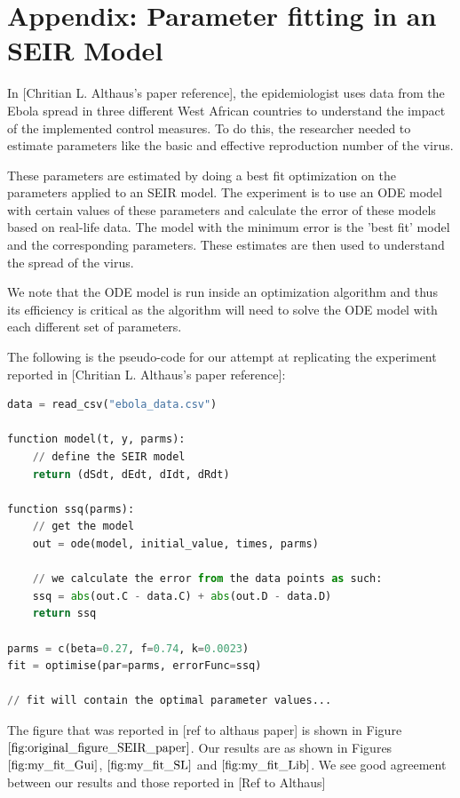 \section{Appendix: Parameter fitting in an SEIR Model}
\label{section:ebola_paper}
In [Chritian L. Althaus's paper reference], the epidemiologist uses data from the Ebola spread in three different West African countries to understand the impact of the implemented control measures. To do this, the researcher needed to estimate parameters like the basic and effective reproduction number of the virus.

These parameters are estimated by doing a best fit optimization on the parameters applied to an SEIR model. The experiment is to use an ODE model with certain values of these parameters and calculate the error of these models based on real-life data. The model with the minimum error is the 'best fit' model and the corresponding parameters. These estimates are then used to understand the spread of the virus. 

We note that the ODE model is run inside an optimization algorithm and thus its efficiency is critical as the algorithm will need to solve the ODE model with each different set of parameters.

The following is the pseudo-code for our attempt at replicating the experiment reported in [Chritian L. Althaus's paper reference]:

\begin{minipage}{\linewidth}
\begin{lstlisting}[language=Python]
data = read_csv("ebola_data.csv")

function model(t, y, parms):
    // define the SEIR model
    return (dSdt, dEdt, dIdt, dRdt)

function ssq(parms):
    // get the model
    out = ode(model, initial_value, times, parms)

    // we calculate the error from the data points as such:
    ssq = abs(out.C - data.C) + abs(out.D - data.D)
    return ssq

parms = c(beta=0.27, f=0.74, k=0.0023)
fit = optimise(par=parms, errorFunc=ssq)

// fit will contain the optimal parameter values...
\end{lstlisting}
\end{minipage}

The figure that was reported in [ref to althaus paper] is shown in Figure $\ref{fig:original_figure_SEIR_paper}$. Our results are as shown in Figures $\ref{fig:my_fit_Gui}$, $\ref{fig:my_fit_SL}$ and $\ref{fig:my_fit_Lib}$. We see good agreement between our results and those reported in [Ref to Althaus]

